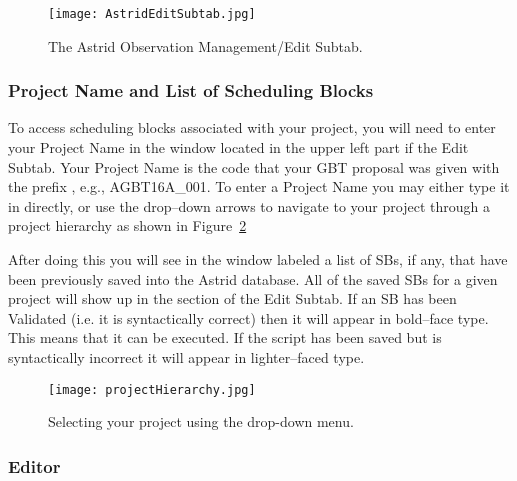 \begin{figure}[!h]
\setlength{\abovecaptionskip}{0pt}
\begin{center}
\texttt{[image: AstridEditSubtab.jpg]}
\caption[Astrid Observation Management/Edit Subtab]
{The \gls{Astrid} Observation Management/Edit Subtab. \label{fig:astridedit} }
\end{center}
\end{figure}

\subsubsection{Project Name and List of Scheduling Blocks}
\label{sec:projectID}
To access scheduling blocks associated with your project, you will need to
enter your Project Name in the  window located in the upper left
part if the Edit Subtab.  Your Project Name is the code that your \gls{GBT}
proposal was given with the prefix , e.g., AGBT16A\_001. To enter a
Project Name you may either type it in directly, or use the drop--down
arrows to navigate to your project through a project hierarchy as shown in
Figure~\ref{fig:projectHierarchy}

After doing this you will see in the window labeled 
a list of \glspl{SB}, if any, that have been previously saved into the
\gls{Astrid} database. All of the saved \glspl{SB} for a given project will
show up in the  section of the Edit Subtab.  If an \gls{SB}
has been Validated (i.e. it is syntactically correct) then it will appear
in bold--face type.  This means that it can be executed.  If the script
has been saved but is syntactically incorrect it will appear in  
lighter--faced type.

\newpage

\begin{figure}[!h]
\setlength{\abovecaptionskip}{0pt}\setlength{\belowcaptionskip}{0pt}
\begin{center}
\texttt{[image: projectHierarchy.jpg]}
\caption[Selecting your project using the drop-down menu]
{Selecting your project using the drop-down menu. \label{fig:projectHierarchy} }
\end{center}
\end{figure}

\subsubsection{Editor}\label{sec:astridimport}

